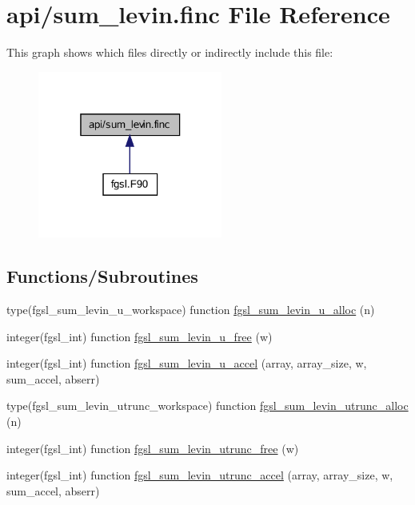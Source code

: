 \hypertarget{sum__levin_8finc}{}\section{api/sum\+\_\+levin.finc File Reference}
\label{sum__levin_8finc}
This graph shows which files directly or indirectly include this file\+:\nopagebreak
\begin{figure}[H]
\begin{center}
\leavevmode
\includegraphics[width=172pt]{sum__levin_8finc__dep__incl}
\end{center}
\end{figure}
\subsection*{Functions/\+Subroutines}
\begin{DoxyCompactItemize}
\item 
type(fgsl\+\_\+sum\+\_\+levin\+\_\+u\+\_\+workspace) function \hyperlink{sum__levin_8finc_ad6ebf8afa62ed4d6df0ccc045becc409}{fgsl\+\_\+sum\+\_\+levin\+\_\+u\+\_\+alloc} (n)
\item 
integer(fgsl\+\_\+int) function \hyperlink{sum__levin_8finc_aaf7b37dc4577512c18cb3973ad84252e}{fgsl\+\_\+sum\+\_\+levin\+\_\+u\+\_\+free} (w)
\item 
integer(fgsl\+\_\+int) function \hyperlink{sum__levin_8finc_ae945413c5c10344d97cc10002dd760c2}{fgsl\+\_\+sum\+\_\+levin\+\_\+u\+\_\+accel} (array, array\+\_\+size, w, sum\+\_\+accel, abserr)
\item 
type(fgsl\+\_\+sum\+\_\+levin\+\_\+utrunc\+\_\+workspace) function \hyperlink{sum__levin_8finc_a877def7077d13d9c9f6940266bc44a54}{fgsl\+\_\+sum\+\_\+levin\+\_\+utrunc\+\_\+alloc} (n)
\item 
integer(fgsl\+\_\+int) function \hyperlink{sum__levin_8finc_a4703b473d5be9896645002d25bff9467}{fgsl\+\_\+sum\+\_\+levin\+\_\+utrunc\+\_\+free} (w)
\item 
integer(fgsl\+\_\+int) function \hyperlink{sum__levin_8finc_aafbf5e22d1e3d84b254f5b0800c4c3bf}{fgsl\+\_\+sum\+\_\+levin\+\_\+utrunc\+\_\+accel} (array, array\+\_\+size, w, sum\+\_\+accel, abserr)
\end{DoxyCompactItemize}


